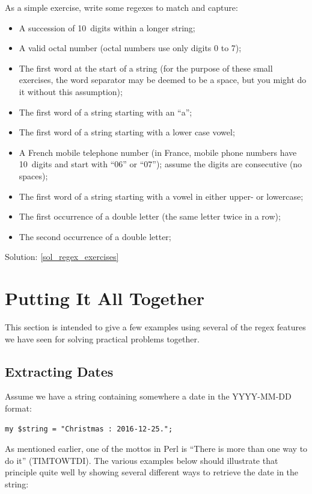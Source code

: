 As a simple exercise, write some regexes to match and capture:

\begin{itemize}
\item A succession of 10~digits within a longer string;
\item A valid octal number (octal numbers use only 
digits 0 to 7);
\item The first word at the start of a string (for the 
purpose of these small exercises, the word 
separator may be deemed to be a space, but you might do 
it without this assumption);
\item The first word of a string starting with an ``a'';
\item The first word of a string starting with a lower case vowel;
\item A French mobile telephone number (in France, mobile 
phone numbers have 10~digits and start with ``06'' or ``07''); 
assume the digits are consecutive (no spaces);
\item The first word of a string starting with a vowel in 
either upper- or lowercase;
\item The first occurrence of a double letter (the
same letter twice in a row);
\item The second occurrence of a double letter;
 
\end{itemize}

Solution: \ref{sol_regex_exercises}
 

\section{Putting It All Together}

This section is intended to give a few examples using 
several of the regex features we have seen for solving practical 
problems together.

\subsection{Extracting Dates}
\label{extracting_dates}

Assume we have a string containing somewhere a 
date in the YYYY-MM-DD format:

\begin{verbatim}
my $string = "Christmas : 2016-12-25.";
\end{verbatim}
%

As mentioned earlier, one of the mottos in Perl is ``There 
is more than one way to do it'' (TIMTOWTDI). The various 
examples below should illustrate that principle quite well 
by showing several different ways to retrieve the date in 
the string:

